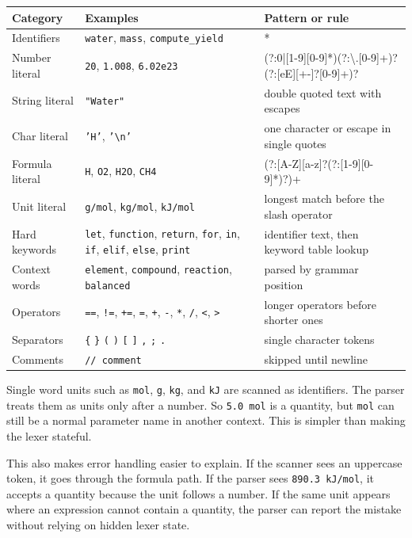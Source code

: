 \documentclass[11pt,a4paper]{article}
\newcommand{\code}[1]{\texttt{#1}}
\newcommand{\rx}[1]{\scriptsize\ttfamily #1}
\begin{document}
{\footnotesize
\begin{tabularx}{\linewidth}{@{}p{2.65cm}p{3.7cm}Y@{}}
\toprule
\textbf{Category} & \textbf{Examples} & \textbf{Pattern or rule} \\
\midrule
Identifiers & \code{water}, \code{mass}, \code{compute\_yield} & \rx{[a-z\_][A-Za-z0-9\_]*} \\
Number literal & \code{20}, \code{1.008}, \code{6.02e23} & \rx{(?:0|[1-9][0-9]*)(?:\textbackslash.[0-9]+)?(?:[eE][+-]?[0-9]+)?} \\
String literal & \code{"Water"} & double quoted text with escapes \\
Char literal & \code{'H'}, \code{'\textbackslash{}n'} & one character or escape in single quotes \\
Formula literal & \code{H}, \code{O2}, \code{H2O}, \code{CH4} & \rx{(?:[A-Z][a-z]?(?:[1-9][0-9]*)?)+} \\
Unit literal & \code{g/mol}, \code{kg/mol}, \code{kJ/mol} & longest match before the slash operator \\
Hard keywords & \code{let}, \code{function}, \code{return}, \code{for}, \code{in}, \code{if}, \code{elif}, \code{else}, \code{print} & identifier text, then keyword table lookup \\
Context words & \code{element}, \code{compound}, \code{reaction}, \code{balanced} & parsed by grammar position \\
Operators & \code{==}, \code{!=}, \code{+=}, \code{=}, \code{+}, \code{-}, \code{*}, \code{/}, \code{<}, \code{>} & longer operators before shorter ones \\
Separators & \code{\{} \code{\}} \code{(} \code{)} \code{[} \code{]} \code{,} \code{;} \code{.} & single character tokens \\
Comments & \code{// comment} & skipped until newline \\
\bottomrule
\end{tabularx}}

Single word units such as \code{mol}, \code{g}, \code{kg}, and \code{kJ} are scanned as identifiers.
The parser treats them as units only after a number. So \code{5.0 mol} is a quantity, but \code{mol}
can still be a normal parameter name in another context. This is simpler than making the lexer
stateful.

This also makes error handling easier to explain. If the scanner sees an uppercase token, it goes
through the formula path. If the parser sees \code{890.3 kJ/mol}, it accepts a quantity because the
unit follows a number. If the same unit appears where an expression cannot contain a quantity,
the parser can report the mistake without relying on hidden lexer state.
\end{document}
